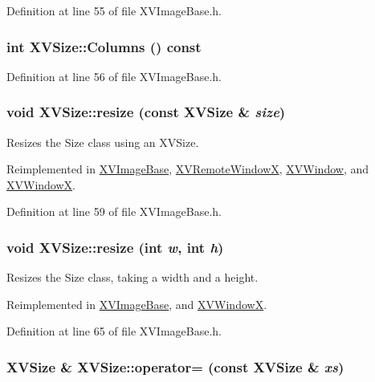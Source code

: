 Definition at line 55 of file XVImage\-Base.h.\label{XVSize_a7}
\hypertarget{class_XVSize_a7}{
\subsubsection[Columns]{\setlength{\rightskip}{0pt plus 5cm}int XVSize::Columns () const}}




Definition at line 56 of file XVImage\-Base.h.\label{XVSize_a8}
\hypertarget{class_XVSize_a8}{
\subsubsection[resize]{\setlength{\rightskip}{0pt plus 5cm}void XVSize::resize (const XVSize \& {\em size})}}


Resizes the Size class using an XVSize.



Reimplemented in \hyperlink{class_XVImageBase_a13}{XVImage\-Base}, \hyperlink{class_XVRemoteWindowX_a9}{XVRemote\-Window\-X}, \hyperlink{class_XVWindow_a4}{XVWindow}, and \hyperlink{class_XVWindowX_a2}{XVWindow\-X}.

Definition at line 59 of file XVImage\-Base.h.\label{XVSize_a9}
\hypertarget{class_XVSize_a9}{
\subsubsection[resize]{\setlength{\rightskip}{0pt plus 5cm}void XVSize::resize (int {\em w}, int {\em h})}}


Resizes the Size class, taking a width and a height.



Reimplemented in \hyperlink{class_XVImageBase_a12}{XVImage\-Base}, and \hyperlink{class_XVWindowX_a3}{XVWindow\-X}.

Definition at line 65 of file XVImage\-Base.h.\label{XVSize_a10}
\hypertarget{class_XVSize_a10}{
\subsubsection[operator=]{\setlength{\rightskip}{0pt plus 5cm}XVSize \& XVSize::operator= (const XVSize \& {\em xs})}}


